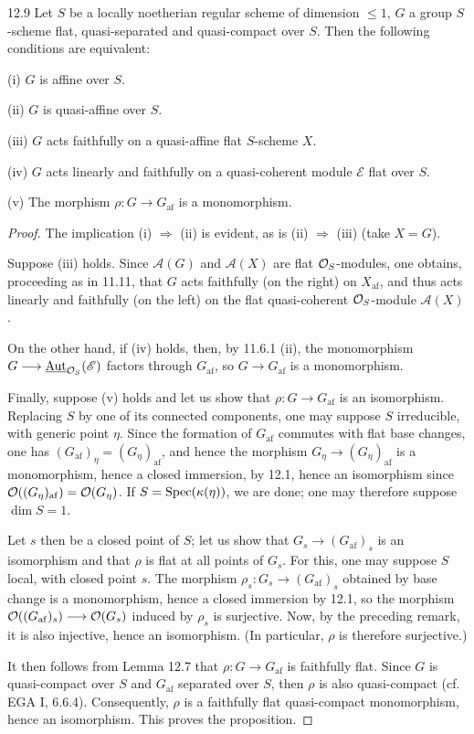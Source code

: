 \begin{proposition}{12.9}\label{VIB.12.9}
Let $S$ be a locally noetherian regular scheme of dimension $\leq1$, $G$ a group $S$-scheme flat, quasi-separated and quasi-compact over $S$. Then the following conditions are equivalent:

(i) $G$ is affine over $S$.

(ii) $G$ is quasi-affine over $S$.

(iii) $G$ acts faithfully on a quasi-affine flat $S$-scheme $X$.

(iv) $G$ acts linearly and faithfully on a quasi-coherent module $\mathscr E$ flat over $S$.

(v) The morphism $\rho:G\to G_{\mathrm{af}}$ is a monomorphism.
\end{proposition}
\begin{proof}
The implication (i) $\Rightarrow$ (ii) is evident, as is (ii) $\Rightarrow$ (iii) (take $X=G$).

Suppose (iii) holds. Since $\mathscr A(G)$ and $\mathscr A(X)$ are flat $\mathcal{O}_S$-modules, one obtains, proceeding as in 11.11, that $G$ acts faithfully (on the right) on $X_{\mathrm{af}}$, and thus acts linearly and faithfully (on the left) on the flat quasi-coherent $\mathcal{O}_S$-module $\mathscr A(X)$.

On the other hand, if (iv) holds, then, by 11.6.1 (ii), the monomorphism $G\longrightarrow\underline{\operatorname{Aut}}_{\mathcal{O}_S}(\mathscr E)$ factors through $G_{\mathrm{af}}$, so $G\to G_{\mathrm{af}}$ is a monomorphism.

Finally, suppose (v) holds and let us show that $\rho:G\to G_{\mathrm{af}}$ is an isomorphism. Replacing $S$ by one of its connected components, one may suppose $S$ irreducible, with generic point $\eta$. Since the formation of $G_{\mathrm{af}}$ commutes with flat base changes, one has $(G_{\mathrm{af}})_\eta=(G_\eta)_{\mathrm{af}}$, and hence the morphism $G_\eta\to(G_\eta)_{\mathrm{af}}$ is a monomorphism, hence a closed immersion, by 12.1, hence an isomorphism since $\mathcal{O}((G_\eta)_{\mathrm{af}})=\mathcal{O}(G_\eta)$. If $S=\operatorname{Spec}(\kappa(\eta))$, we are done; one may therefore suppose $\dim S=1$.

Let $s$ then be a closed point of $S$; let us show that $G_s\to(G_{\mathrm{af}})_s$ is an isomorphism and that $\rho$ is flat at all points of $G_s$. For this, one may suppose $S$ local, with closed point $s$. The morphism $\rho_s:G_s\to(G_{\mathrm{af}})_s$ obtained by base change is a monomorphism, hence a closed immersion by 12.1, so the morphism $\mathcal{O}((G_{\mathrm{af}})_s)\longrightarrow\mathcal{O}(G_s)$ induced by $\rho_s$ is surjective. Now, by the preceding remark, it is also injective, hence an isomorphism. (In particular, $\rho$ is therefore surjective.)

It then follows from Lemma 12.7 that $\rho:G\to G_{\mathrm{af}}$ is faithfully flat. Since $G$ is quasi-compact over $S$ and $G_{\mathrm{af}}$ separated over $S$, then $\rho$ is also quasi-compact (cf. EGA I, 6.6.4). Consequently, $\rho$ is a faithfully flat quasi-compact monomorphism, hence an isomorphism. This proves the proposition.
\end{proof}
